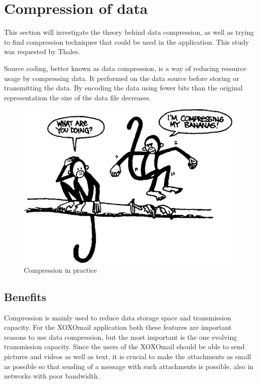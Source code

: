 
\section{Compression of data}

This section will investigate the theory behind data compression, as well as trying to find compression techniques that could be used in the application. This study was requested by Thales.
\newline

Source coding, better known as data compression, is a way of reducing resource usage by compressing data. It performed on the data source before storing or transmitting the data. By encoding the data using fewer bits than the original representation the size of the data file decreases.

\begin{figure}[h!]
\begin{center}
\includegraphics[scale=0.5]{compressionmonkeys}
\caption{Compression in practice \cite{bib:compressionImage}}
\end{center}
\end{figure}

\subsection{Benefits}
Compression is mainly used to reduce data storage space and transmission capacity. For the XOXOmail application both these features are important reasons to use data compression, but the most important is the one evolving transmission capacity. Since the users of the XOXOmail should be able to send pictures and videos as well as text, it is crucial to make the attachments as small as possible so that sending of a message with such attachments is possible, also in networks with poor bandwidth.

